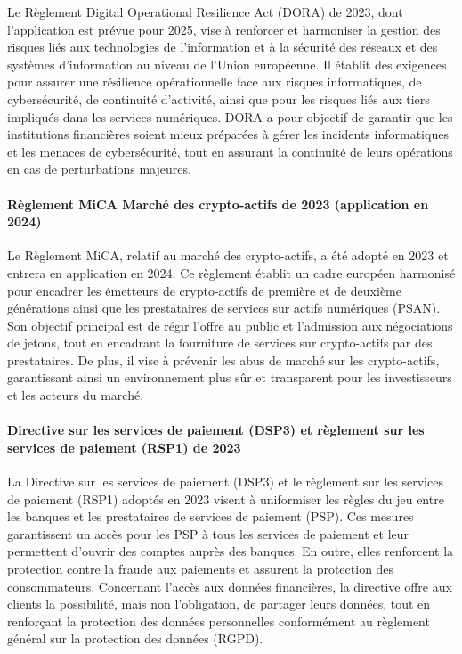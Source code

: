 \documentclass[a4paper, 12pt]{report}
\begin{document}
Le Règlement Digital Operational Resilience Act (DORA) de 2023, dont l'application est prévue pour 2025, vise à renforcer et harmoniser la gestion des risques liés aux technologies de l'information et à la sécurité des réseaux et des systèmes d'information au niveau de l'Union européenne. Il établit des exigences pour assurer une résilience opérationnelle face aux risques informatiques, de cybersécurité, de continuité d'activité, ainsi que pour les risques liés aux tiers impliqués dans les services numériques. DORA a pour objectif de garantir que les institutions financières soient mieux préparées à gérer les incidents informatiques et les menaces de cybersécurité, tout en assurant la continuité de leurs opérations en cas de perturbations majeures.

\paragraph{Règlement MiCA Marché des crypto-actifs de 2023 (application en 2024)}

Le Règlement MiCA, relatif au marché des crypto-actifs, a été adopté en 2023 et entrera en application en 2024. Ce règlement établit un cadre européen harmonisé pour encadrer les émetteurs de crypto-actifs de première et de deuxième générations ainsi que les prestataires de services sur actifs numériques (PSAN). Son objectif principal est de régir l’offre au public et l’admission aux négociations de jetons, tout en encadrant la fourniture de services sur crypto-actifs par des prestataires. De plus, il vise à prévenir les abus de marché sur les crypto-actifs, garantissant ainsi un environnement plus sûr et transparent pour les investisseurs et les acteurs du marché.

\paragraph{Directive sur les services de paiement (DSP3) et règlement sur les services de paiement (RSP1) de 2023}

La Directive sur les services de paiement (DSP3) et le règlement sur les services de paiement (RSP1) adoptés en 2023 visent à uniformiser les règles du jeu entre les banques et les prestataires de services de paiement (PSP). Ces mesures garantissent un accès pour les PSP à tous les services de paiement et leur permettent d'ouvrir des comptes auprès des banques. En outre, elles renforcent la protection contre la fraude aux paiements et assurent la protection des consommateurs. Concernant l'accès aux données financières, la directive offre aux clients la possibilité, mais non l'obligation, de partager leurs données, tout en renforçant la protection des données personnelles conformément au règlement général sur la protection des données (RGPD).
\end{document}
